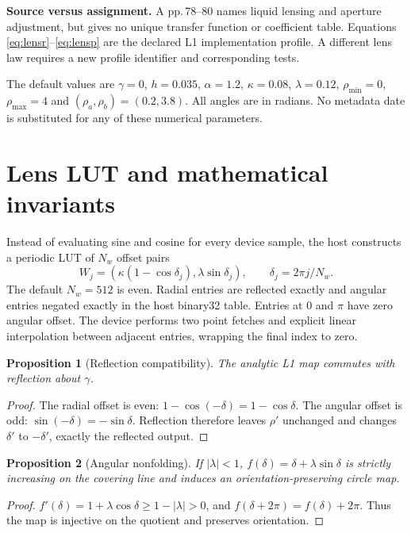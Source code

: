 \documentclass[11pt,a4paper]{article}
\newtheorem{proposition}{Proposition}[section]
\begin{document}
\begin{panel}
\textbf{Source versus assignment.} A pp.\,78--80 names liquid lensing and aperture adjustment, but gives no unique transfer function or coefficient table. Equations \eqref{eq:lensr}--\eqref{eq:lensp} are the declared L1 implementation profile. A different lens law requires a new profile identifier and corresponding tests.
\end{panel}

The default values are $\gamma=0$, $h=0.035$, $\alpha=1.2$, $\kappa=0.08$, $\lambda=0.12$, $\rho_{\min}=0$, $\rho_{\max}=4$ and $(\rho_a,\rho_b)=(0.2,3.8)$. All angles are in radians. No metadata date is substituted for any of these numerical parameters.
\clearpage

\section{Lens LUT and mathematical invariants}
Instead of evaluating sine and cosine for every device sample, the host constructs a periodic LUT of $N_w$ offset pairs
\begin{equation}
W_j=\left(\kappa(1-\cos\delta_j),\lambda\sin\delta_j\right),\qquad
\delta_j=2\pi j/N_w.
\end{equation}
The default $N_w=512$ is even. Radial entries are reflected exactly and angular entries negated exactly in the host binary32 table. Entries at $0$ and $\pi$ have zero angular offset. The device performs two point fetches and explicit linear interpolation between adjacent entries, wrapping the final index to zero.

\begin{proposition}[Reflection compatibility]
The analytic L1 map commutes with reflection about $\gamma$.
\end{proposition}
\begin{proof}
The radial offset is even: $1-\cos(-\delta)=1-\cos\delta$. The angular offset is odd: $\sin(-\delta)=-\sin\delta$. Reflection therefore leaves $\rho'$ unchanged and changes $\delta'$ to $-\delta'$, exactly the reflected output.
\end{proof}

\begin{proposition}[Angular nonfolding]
If $|\lambda|<1$, $f(\delta)=\delta+\lambda\sin\delta$ is strictly increasing on the covering line and induces an orientation-preserving circle map.
\end{proposition}
\begin{proof}
$f'(\delta)=1+\lambda\cos\delta\ge1-|\lambda|>0$, and $f(\delta+2\pi)=f(\delta)+2\pi$. Thus the map is injective on the quotient and preserves orientation.
\end{proof}
\end{document}
